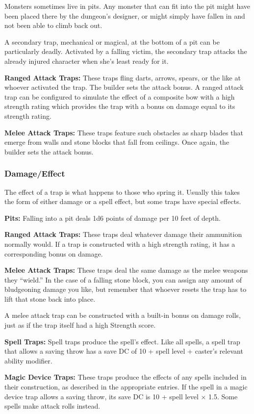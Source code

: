 Monsters sometimes live in pits. Any monster that can fit into the pit might have been placed there by the dungeon's designer, or might simply have fallen in and not been able to climb back out.

A secondary trap, mechanical or magical, at the bottom of a pit can be particularly deadly. Activated by a falling victim, the secondary trap attacks the already injured character when she's least ready for it.

\textbf{Ranged Attack Traps:} These traps fling darts, arrows, spears, or the like at whoever activated the trap. The builder sets the attack bonus. A ranged attack trap can be configured to simulate the effect of a composite bow with a high strength rating which provides the trap with a bonus on damage equal to its strength rating.

\textbf{Melee Attack Traps:} These traps feature such obstacles as sharp blades that emerge from walls and stone blocks that fall from ceilings. Once again, the builder sets the attack bonus.

\subsubsection{Damage/Effect}
The effect of a trap is what happens to those who spring it. Usually this takes the form of either damage or a spell effect, but some traps have special effects.

\textbf{Pits:} Falling into a pit deals 1d6 points of damage per 10 feet of depth.

\textbf{Ranged Attack Traps:} These traps deal whatever damage their ammunition normally would. If a trap is constructed with a high strength rating, it has a corresponding bonus on damage.

\textbf{Melee Attack Traps:} These traps deal the same damage as the melee weapons they ``wield.'' In the case of a falling stone block, you can assign any amount of bludgeoning damage you like, but remember that whoever resets the trap has to lift that stone back into place.

A melee attack trap can be constructed with a built-in bonus on damage rolls, just as if the trap itself had a high Strength score.

\textbf{Spell Traps:} Spell traps produce the spell's effect. Like all spells, a spell trap that allows a saving throw has a save DC of 10 + spell level + caster's relevant ability modifier.

\textbf{Magic Device Traps:} These traps produce the effects of any spells included in their construction, as described in the appropriate entries. If the spell in a magic device trap allows a saving throw, its save DC is 10 + spell level $\times$ 1.5. Some spells make attack rolls instead.

